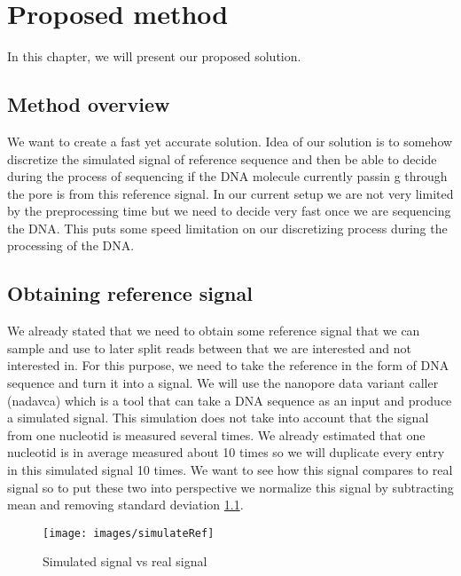 \chapter{Proposed method}

\label{kap:proposedMethod} %

In this chapter, we will present our proposed solution.

\section{Method overview}

We want to create a fast yet accurate solution. Idea of our solution is to somehow
discretize the simulated signal of reference sequence and then be able to decide
during the process of sequencing if the DNA molecule currently passin   g through the
pore is from this reference signal. In our current setup we are not very limited
by the preprocessing time but we need to decide very fast once we are sequencing
the DNA. This puts some speed limitation on our discretizing process during the
processing of the DNA.

\section{Obtaining reference signal}

We already stated that we need to obtain some reference signal that we
can sample and use to later split reads between that we are interested and not
interested in. For this purpose, we need to take the reference in the form of DNA sequence
and turn it into a signal. We will use the nanopore data
variant caller (nadavca) which is a tool that can take a DNA sequence as an input
and produce a simulated signal. This simulation does not take into account that
the signal from one nucleotid is measured several times. We already estimated
that one nucleotid is in average measured about 10 times so we will duplicate every
entry in this simulated signal 10 times. We want to see how this signal compares
to real signal so to put these two into perspective we normalize this signal by
subtracting mean and removing standard deviation \ref{obr:simVsReal}.

\begin{figure}
\centerline{\texttt{[image: images/simulateRef]}}
\caption[Hehe]{Simulated signal vs real signal}
\label{obr:simVsReal}
\end{figure}

